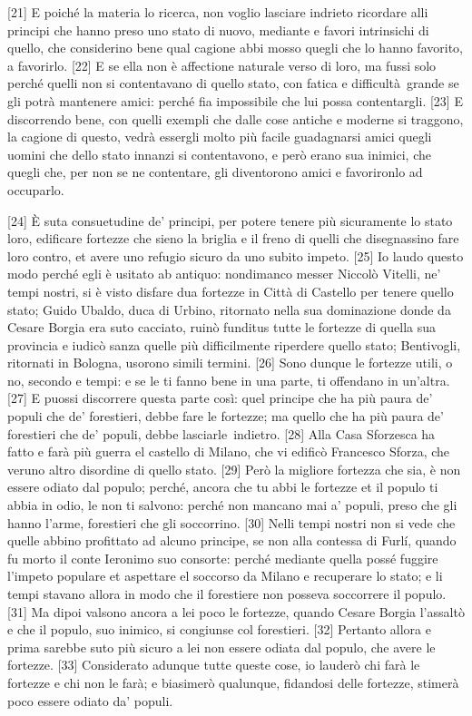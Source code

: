 {[}21{]} E poiché la materia lo ricerca, non voglio lasciare indrieto
ricordare alli principi che hanno preso uno stato di nuovo, mediante e
favori intrinsichi di quello, che considerino bene qual cagione abbi
mosso quegli che lo hanno favorito, a favorirlo. {[}22{]} E se ella non
è affectione naturale verso di loro, ma fussi solo perché quelli non si
contentavano di quello stato, con fatica e difficultà\est\ grande se gli
potrà mantenere amici: perché fia impossibile che lui possa
contentargli. {[}23{]} E discorrendo bene, con quelli exempli che dalle
cose antiche e moderne si traggono, la cagione di questo, vedrà essergli
molto più facile guadagnarsi amici quegli uomini che dello stato innanzi
si contentavono, e però erano sua inimici, che quegli che, per non se ne
contentare, gli diventorono amici e favorironlo ad occuparlo.

{[}24{]} È suta consuetudine de' principi, per potere tenere più
sicuramente lo stato loro, edificare fortezze che sieno la briglia e il
freno di quelli che disegnassino fare loro contro, et avere uno refugio
sicuro da uno subito impeto. {[}25{]} Io laudo questo modo perché egli è
usitato ab antiquo: nondimanco messer Niccolò Vitelli, ne' tempi nostri,
si è visto disfare dua fortezze in Città di Castello per tenere quello
stato; Guido Ubaldo, duca di Urbino, ritornato nella sua dominazione
donde da Cesare Borgia era suto cacciato, ruinò funditus tutte le
fortezze di quella sua provincia e iudicò sanza quelle più difficilmente
riperdere quello stato; Bentivogli, ritornati in Bologna, usorono simili
termini. {[}26{]} Sono dunque le fortezze utili, o no, secondo e tempi:
e se le ti fanno bene in una parte, ti offendano in un'altra. {[}27{]} E
puossi discorrere questa parte così: quel principe che ha più paura de'
populi che de' forestieri, debbe fare le fortezze; ma quello che ha più
paura de' forestieri che de' populi, debbe lasciarle\est\ indietro. {[}28{]}
Alla Casa Sforzesca ha fatto e farà più guerra el castello di Milano,
che vi edificò Francesco Sforza, che veruno altro disordine di quello
stato. {[}29{]} Però la migliore fortezza che sia, è non essere odiato
dal populo; perché, ancora che tu abbi le fortezze et il populo ti abbia
in odio, le non ti salvono: perché non mancano mai a' populi, preso che
gli hanno l'arme, forestieri che gli soccorrino. {[}30{]} Nelli tempi
nostri non si vede che quelle abbino profittato ad alcuno principe, se
non alla contessa di Furlí, quando fu morto il conte Ieronimo suo
consorte: perché mediante quella possé fuggire l'impeto populare et
aspettare el soccorso da Milano e recuperare lo stato; e li tempi
stavano allora in modo che il forestiere non posseva soccorrere il
populo. {[}31{]} Ma dipoi valsono ancora a lei poco le fortezze, quando
Cesare Borgia l'assaltò e che il populo, suo inimico, si congiunse col
forestieri. {[}32{]} Pertanto allora e prima sarebbe suto più sicuro a
lei non essere odiata dal populo, che avere le fortezze. {[}33{]}
Considerato adunque tutte queste cose, io lauderò chi farà le fortezze e
chi non le farà; e biasimerò qualunque, fidandosi delle fortezze,
stimerà poco essere odiato da' populi.

